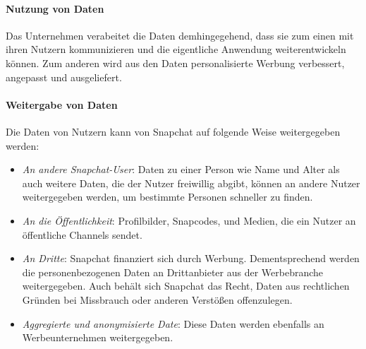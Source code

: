 \paragraph{Nutzung von Daten}
Das Unternehmen verabeitet die Daten demhingegehend, dass sie zum einen mit
ihren Nutzern kommunizieren und die eigentliche Anwendung weiterentwickeln
k\"onnen. Zum anderen wird aus den Daten personalisierte Werbung verbessert,
angepasst und ausgeliefert.

\paragraph{Weitergabe von Daten}
Die Daten von Nutzern kann von Snapchat auf folgende Weise weitergegeben werden:
\begin{itemize}
	\item \emph{An andere Snapchat-User}: Daten zu einer Person wie Name und
		Alter als auch weitere Daten, die der Nutzer freiwillig abgibt,
		k\"onnen an andere Nutzer weitergegeben werden, um bestimmte Personen
		schneller zu finden.
	\item \emph{An die \"Offentlichkeit}: Profilbilder, Snapcodes, und Medien,
		die ein Nutzer an \"offentliche Channels sendet.
	\item \emph{An Dritte}: Snapchat finanziert sich durch Werbung.
		Dementsprechend werden die personenbezogenen Daten an Drittanbieter aus
		der Werbebranche weitergegeben. Auch beh\"alt sich Snapchat das Recht,
		Daten aus rechtlichen Gr\"unden bei Missbrauch oder anderen
		Verst\"o{\ss}en offenzulegen.
	\item \emph{Aggregierte und anonymisierte Date}: Diese Daten werden
		ebenfalls an Werbeunternehmen weitergegeben.
\end{itemize}
